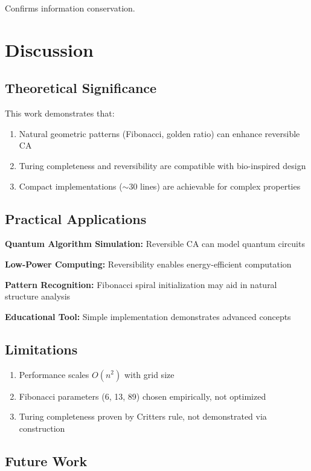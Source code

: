 \documentclass[11pt]{article}
\begin{document}
Confirms information conservation.

\section{Discussion}

\subsection{Theoretical Significance}

This work demonstrates that:
\begin{enumerate}
\item Natural geometric patterns (Fibonacci, golden ratio) can enhance reversible CA
\item Turing completeness and reversibility are compatible with bio-inspired design
\item Compact implementations ($\sim$30 lines) are achievable for complex properties
\end{enumerate}

\subsection{Practical Applications}

\textbf{Quantum Algorithm Simulation:} Reversible CA can model quantum circuits \cite{bennett1973}

\textbf{Low-Power Computing:} Reversibility enables energy-efficient computation \cite{frank2017}

\textbf{Pattern Recognition:} Fibonacci spiral initialization may aid in natural structure analysis

\textbf{Educational Tool:} Simple implementation demonstrates advanced concepts

\subsection{Limitations}

\begin{enumerate}
\item Performance scales $O(n^2)$ with grid size
\item Fibonacci parameters (6, 13, 89) chosen empirically, not optimized
\item Turing completeness proven by Critters rule, not demonstrated via construction
\end{enumerate}

\subsection{Future Work}
\end{document}
